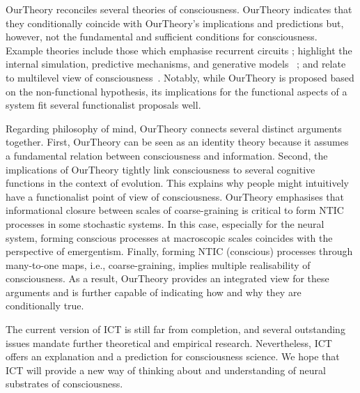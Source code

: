 \documentclass[utf8]{article}
\begin{document}
    
    
    
    \ac{OurTheory} reconciles several theories of consciousness. \ac{OurTheory} indicates that they conditionally coincide with \ac{OurTheory}'s implications and predictions but, however, not the fundamental and sufficient conditions for consciousness. Example theories include those which emphasise recurrent circuits \citep{lamme2006towards, edelman1992bright}; highlight the internal simulation,  predictive mechanisms, and generative models ~\citep{revonsuo2006inner, clark_2013,Hohwy2013, kanai_chang_yu_de_abril_biehl_guttenberg_2019, seth2014predictive, seth2015presence}; and relate to multilevel view of consciousness~\citep{pennartz2018consciousness,pennartz2015brain,prinz2007intermediate, jackendoff1987consciousness}. Notably, while \ac{OurTheory} is proposed based on the non-functional hypothesis, its implications for the functional aspects of a system fit several functionalist proposals well.
	
	
	Regarding philosophy of mind, \ac{OurTheory} connects several distinct arguments together. First, \ac{OurTheory} can be seen as an identity theory because it assumes a fundamental relation between consciousness and information. Second, the implications of \ac{OurTheory} tightly link consciousness to several cognitive functions in the context of evolution. This explains why people might intuitively have a functionalist point of view of consciousness. \ac{OurTheory} emphasises that informational closure between scales of coarse-graining is critical to form NTIC processes in some stochastic systems. In this case, especially for the neural system, forming conscious processes at macroscopic scales coincides with the perspective of emergentism. Finally, forming NTIC (conscious) processes through many-to-one maps, i.e., coarse-graining, implies multiple realisability of consciousness. As a result, \ac{OurTheory} provides an integrated view for these arguments and is further capable of indicating how and why they are conditionally true.
	
	The current version of ICT is still far from completion, and several outstanding issues mandate further theoretical and empirical research. Nevertheless, ICT offers an explanation and a prediction for consciousness science. We hope that ICT will provide a new way of thinking about and understanding of neural substrates of consciousness.  
	
\end{document}
